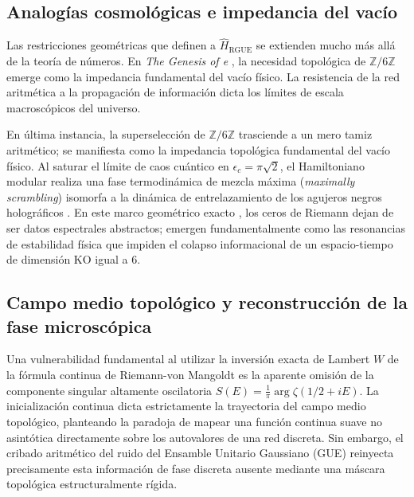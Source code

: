 \documentclass[aps,prl,preprint,superscriptaddress,floatfix]{revtex4-2}
\newcommand{\Zmod}{\mathbb{Z}/6\mathbb{Z}}
\begin{document}
\subsection{Analogías cosmológicas e impedancia del vacío}

Las restricciones geométricas que definen a $\hat{H}_{\text{RGUE}}$ se extienden mucho más allá de la teoría de números. En \textit{The Genesis of e} \cite{PeinadorGenesis}, la necesidad topológica de $\Zmod$ emerge como la impedancia fundamental del vacío físico. La resistencia de la red aritmética a la propagación de información dicta los límites de escala macroscópicos del universo.

En última instancia, la superselección de $\Zmod$ trasciende a un mero tamiz aritmético; se manifiesta como la impedancia topológica fundamental del vacío físico. Al saturar el límite de caos cuántico en $\epsilon_c = \pi\sqrt{2}$, el Hamiltoniano modular realiza una fase termodinámica de mezcla máxima (\textit{maximally scrambling}) isomorfa a la dinámica de entrelazamiento de los agujeros negros holográficos \cite{Saad2019}. En este marco geométrico exacto \cite{ConnesConsani2021}, los ceros de Riemann dejan de ser datos espectrales abstractos; emergen fundamentalmente como las resonancias de estabilidad física que impiden el colapso informacional de un espacio-tiempo de dimensión KO igual a 6.

\subsection{Campo medio topológico y reconstrucción de la fase microscópica}

Una vulnerabilidad fundamental al utilizar la inversión exacta de Lambert $W$ de la fórmula continua de Riemann-von Mangoldt es la aparente omisión de la componente singular altamente oscilatoria $S(E) = \frac{1}{\pi} \arg \zeta(1/2+iE)$. La inicialización continua dicta estrictamente la trayectoria del campo medio topológico, planteando la paradoja de mapear una función continua suave no asintótica directamente sobre los autovalores de una red discreta. Sin embargo, el cribado aritmético del ruido del Ensamble Unitario Gaussiano (GUE) reinyecta precisamente esta información de fase discreta ausente mediante una máscara topológica estructuralmente rígida.
\end{document}
